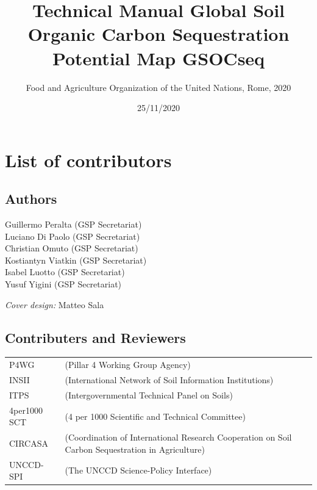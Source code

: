 \documentclass[
  10pt,
  b5paper,
]{book}
\title{Technical Manual Global Soil Organic Carbon Sequestration Potential Map GSOCseq}
\author{Food and Agriculture Organization of the United Nations, Rome, 2020}
\date{25/11/2020}
\begin{document}
\maketitle

\frontmatter
{}   
\mainmatter

\hypertarget{list-of-contributors}{%
\chapter*{List of contributors}\label{list-of-contributors}}

\hypertarget{authors}{%
\section*{Authors}\label{authors}}

Guillermo Peralta (GSP Secretariat)\\
Luciano Di Paolo (GSP Secretariat)\\
Christian Omuto (GSP Secretariat)\\
Kostiantyn Viatkin (GSP Secretariat)\\
Isabel Luotto (GSP Secretariat)\\
Yusuf Yigini (GSP Secretariat)

\emph{Cover design:} Matteo Sala

\hypertarget{contributers-and-reviewers}{%
\section*{Contributers and Reviewers}\label{contributers-and-reviewers}}

\begin{longtable}[]{@{}
  >{\raggedright\arraybackslash}p{}
  >{\raggedright\arraybackslash}p{}@{}}
\toprule
& \\
\midrule
\endhead
P4WG & (Pillar 4 Working Group Agency) \\
INSII & (International Network of Soil Information Institutions) \\
ITPS & (Intergovernmental Technical Panel on Soils) \\
4per1000 SCT & (4 per 1000 Scientific and Technical Committee) \\
CIRCASA & (Coordination of International Research Cooperation on Soil Carbon Sequestration in Agriculture) \\
UNCCD-SPI & (The UNCCD Science-Policy Interface) \\
\bottomrule
\end{longtable}
\end{document}
